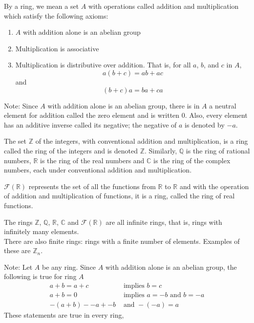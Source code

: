 \documentclass[12pt]{article}
\newcommand{\integers}{\mathds{Z}}
\newcommand{\rationals}{\mathds{Q}}
\newcommand{\reals}{\mathds{R}}
\newcommand{\complex}{\mathds{C}}
\begin{document}
\begin{definition} By a ring, we mean a set $A$ with operations called addition and multiplication which satisfy the following axioms: \begin{enumerate} 
\item $A$ with addition alone is an abelian group
\item Multiplication is associative
\item Multiplication is distributive over addition. That is, for all $a$, $b$, and $c$ in $A$, $$a(b+c) = ab + ac$$ and $$(b+c)a = ba + ca$$ \end{enumerate} \end{definition} 
Note: Since $A$ with addition alone is an abelian group, there is in $A$ a neutral element for addition called the zero element and is written $0$. Also, every element has an additive inverse called its negative; the negative of $a$ is denoted by $-a$. 

\begin{example} The set $\integers$ of the integers, with conventional addition and multiplication, is a ring called the ring of the integers and is denoted $\integers$. Similarly, $\rationals$ is the ring of rational numbers, $\reals$ is the ring of the real numbers and $\complex$ is the ring of the complex numbers, each under conventional addition and multiplication. \end{example} 

\begin{example} $\mathcal{F}(\reals)$ represents the set of all the functions from $\reals$ to $\reals$ and with the operation of addition and multiplication of functions, it is a ring, called the ring of real functions. \end{example}

\begin{definition} The rings $\integers$, $\rationals$, $\reals$, $\complex$ and $\mathcal{F}(\reals)$ are all infinite rings, that is, rings with infinitely many elements. \\ There are also finite rings: rings with a finite number of elements. Examples of these are $\integers_n$. \end{definition} 

Note: Let $A$ be any ring. Since $A$ with addition alone is an abelian group, the following is true for ring $A$ $$ \begin{aligned} a + b = a + c &\text{ implies } b = c \\ a + b = 0 &\text{ implies } a = -b \text{ and } b = -a \\ -(a + b) --a + -b &\text{ and } -(-a) = a \end{aligned} $$ These statements are true in every ring, 
\end{document}
